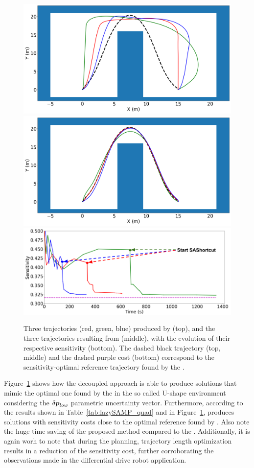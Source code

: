 \begin{figure}[htp]
    \centering
    \includegraphics[width=0.7\linewidth]{figures/samp/U_shape_3in1_before.png}
    \includegraphics[width=0.7\linewidth]{figures/samp/U_shape_3in1_after.png}
    \includegraphics[width=0.7\linewidth]{figures/samp/U_shape_3in1_sensi.png}
    \caption{Three trajectories (red, green, blue) produced by  (top), and the three trajectories resulting from  (middle), with the evolution of their respective sensitivity (bottom). 
    The dashed black trajectory (top, middle) and the dashed purple cost (bottom) correspond to the sensitivity-optimal reference trajectory found by the .}
    \label{fig:U_shape}
\end{figure}

Figure~\ref{fig:U_shape} shows how the decoupled approach is able to produce solutions that mimic the optimal one found by the  in the so called U-shape environment considering the $\delta\boldsymbol{p}_{low}$ parametric uncertainty vector.
Furthermore, according to the results shown in Table~\ref{tab:lazySAMP_quad} and in Figure~\ref{fig:U_shape},  produces solutions with sensitivity costs close to the optimal reference found by . 
Also note the huge time saving of the proposed method compared to the .
Additionally, it is again worh to note that during the  planning, trajectory length optimization results in a reduction of the sensitivity cost, further corroborating the observations made in the differential drive robot application.

